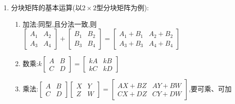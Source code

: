 \documentclass[8pt a4paper,oneside,UTF8]{ctexbook}
\begin{document}
\begin{sloppypar}
\begin{enumerate}
\begin{criterion}{$n$阶方阵计算行列式的注意事项}{}
                  \begin{enumerate}
                      \item $\left|kA\right|=k^{n}\left|A\right|\neq k\left|A\right|\left(n\geqslant2, k\neq0, 1\right)$
                      \item 一般地,$\left|A+B\right|\neq\left|A\right|+\left|B\right|$
                      \item $A\neq O\Rightarrow\left|A\right|\neq 0$ \footnote{如:$A=\begin{bmatrix}1 & 0 \\ 0 & 0\end{bmatrix}$}
                      \item $A\neq B\nRightarrow\left|A\right|\neq\left|B\right|$
                      \item $\left|A^{\mathrm{T}}\right|=\left|A\right|$ \footnote{行列式行列互换值不变}
                      \item 设$A,B$是同阶方阵,则$|AB|=|A\|B|$
                  \end{enumerate}
              \end{criterion}
        \item 分块矩阵的基本运算(以$2 \times 2$型分块矩阵为例):
              \begin{enumerate}
                  \item 加法:同型,且分法一致,则$\begin{bmatrix}A_1&A_2\\A_3&A_4\end{bmatrix}+\begin{bmatrix}B_1&B_2\\B_3&B_4\end{bmatrix}=\begin{bmatrix}A_1+B_1&A_2+B_2\\A_3+B_3&A_4+B_4\end{bmatrix}$
                  \item 数乘:$k{\begin{bmatrix}A&B\\C&D\end{bmatrix}}={\begin{bmatrix}kA&kB\\kC&kD\end{bmatrix}}$
                  \item 乘法:$\begin{bmatrix}A&B\\C&D\end{bmatrix}\begin{bmatrix}X&Y\\Z&W\end{bmatrix}=\begin{bmatrix}AX+BZ&AY+BW\\CX+DZ&CY+DW\end{bmatrix}$,要可乘、可加

\end{enumerate}
\end{enumerate}
\end{sloppypar}
\end{document}
